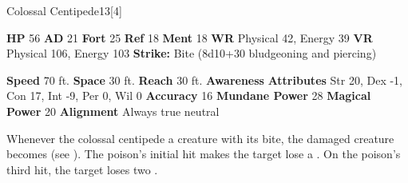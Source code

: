   \begin{monsubsection}{Colossal Centipede}{13}[4]
    \vspace{-1em}\vspace{-1em}
    \vspace{0em}

    
    

    \begin{spellcontent}
      \begin{spelltargetinginfo}
        \pari \textbf{HP} 56 \monsep
          \textbf{AD} 21 \monsep
          \textbf{Fort} 25 \monsep
          \textbf{Ref} 18 \monsep
          \textbf{Ment} 18
        \pari \textbf{WR} Physical 42, Energy 39 \monsep
        \textbf{VR} Physical 106, Energy 103
        \pari \textbf{Strike:}
            Bite  (8d10+30 bludgeoning and piercing)
      \end{spelltargetinginfo}
    \end{spellcontent}
    \begin{monsterfooter}
      \pari \textbf{Speed} 70 ft. \monsep
        \textbf{Space} 30 ft. \monsep
        \textbf{Reach} 30 ft.
      \pari \textbf{Awareness} 
      \pari \textbf{Attributes}
        Str 20, Dex -1,
        Con 17, Int -9,
        Per 0, Wil 0
      \pari \textbf{Accuracy} 16 \monsep
        \textbf{Mundane Power} 28 \monsep
      \textbf{Magical Power} 20
      \pari \textbf{Alignment} Always true neutral
    \end{monsterfooter}
  \end{monsubsection}
        Whenever the colossal centipede  a creature with its bite,
          the damaged creature becomes  (see ).
        The poison's initial hit makes the target lose a .
        On the poison's third hit, the target loses two .
  
